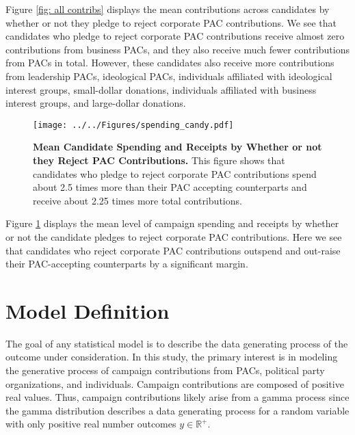 \documentclass[12pt]{article}
\begin{document}
Figure \ref{fig: all contribs} displays the mean contributions across candidates by whether or not they pledge to reject corporate PAC contributions. We see that candidates who pledge to reject corporate PAC contributions receive almost zero contributions from business PACs, and they also receive much fewer contributions from PACs in total. However, these candidates also receive more contributions from leadership PACs, ideological PACs, individuals affiliated with ideological interest groups, small-dollar donations, individuals affiliated with business interest groups, and large-dollar donations.

\begin{figure}[ht]
    \centering
    \texttt{[image: ../../Figures/spending\_candy.pdf]}
    \caption{\textbf{Mean Candidate Spending and Receipts by Whether or not they Reject PAC Contributions.} This figure shows that candidates who pledge to reject corporate PAC contributions spend about 2.5 times more than their PAC accepting counterparts and receive about 2.25 times more total contributions.}
    \label{fig: spending}
\end{figure}

Figure \ref{fig: spending} displays the mean level of campaign spending and receipts by whether or not the candidate pledges to reject corporate PAC contributions. Here we see that candidates who reject corporate PAC contributions outspend and out-raise their PAC-accepting counterparts by a significant margin.


\section{Model Definition}

The goal of any statistical model is to describe the data generating process of the outcome under consideration. In this study, the primary interest is in modeling the generative process of campaign contributions from PACs, political party organizations, and individuals. Campaign contributions are composed of positive real values. Thus, campaign contributions likely arise from a gamma process since the gamma distribution describes a data generating process for a random variable with only positive real number outcomes $y \in  \mathbb{R}^+$. 
\end{document}
